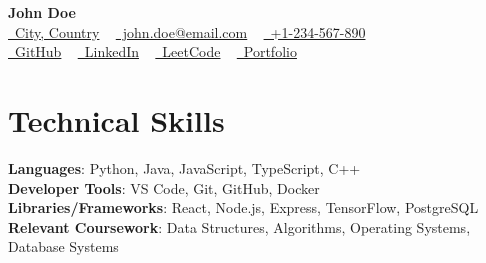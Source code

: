 \documentclass[letterpaper,11pt]{article}
\begin{document}

    \begin{center}
        {\Huge \textbf{John Doe}} \\ \vspace{1pt}
        \href{https://goo.gl/maps/1234}{\raisebox{-0.2\height}\faMapMarker*\ City, Country} ~
        \href{mailto:john.doe@email.com}{\raisebox{-0.2\height}\faEnvelope\ john.doe@email.com} ~ 
        \href{tel:+1234567890}{\raisebox{-0.2\height}\faPhone\ +1-234-567-890} \\ \vspace{1pt}
        \href{https://github.com/johndoe}{\raisebox{-0.2\height}\faGithub\ GitHub} ~
        \href{https://linkedin.com/in/johndoe}{\raisebox{-0.2\height}\faLinkedin\ LinkedIn} ~
        \href{https://leetcode.com/johndoe}{\raisebox{-0.2\height}\faCode\ LeetCode} ~
        \href{https://johndoe.com}{\raisebox{-0.2\height}\faGlobe\ Portfolio}
        \vspace{-8pt}
    \end{center}

    \section{Technical Skills}
    \begin{itemize}[leftmargin=0.015in, label={}]
        \small{\item{
        \textbf{Languages}{: Python, Java, JavaScript, TypeScript, C++} \\
        \textbf{Developer Tools}{: VS Code, Git, GitHub, Docker} \\
        \textbf{Libraries/Frameworks}{: React, Node.js, Express, TensorFlow, PostgreSQL} \\
        \textbf{Relevant Coursework}{: Data Structures, Algorithms, Operating Systems, Database Systems}
        }}
    \end{itemize}
    \vspace{-16pt}
\end{document}
